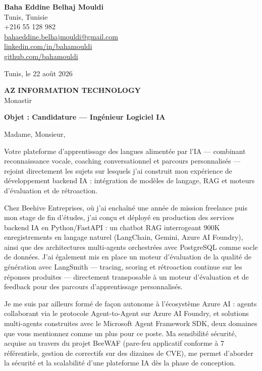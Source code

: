 \documentclass[a4paper,11pt]{article}
\begin{document}
\begin{flushright}
{\bfseries Baha Eddine Belhaj Mouldi}\\
Tunis, Tunisie\\
+216 55 128 982\\
\href{mailto:bahaeddine.belhajmouldi@gmail.com}{bahaeddine.belhajmouldi@gmail.com}\\
\href{https://linkedin.com/in/bahamouldi}{linkedin.com/in/bahamouldi}\\
\href{https://github.com/bahamouldi}{github.com/bahamouldi}
\end{flushright}

\vspace{0.8cm}

\begin{flushleft}
Tunis, le 22 août 2026

\vspace{0.8cm}

{\bfseries AZ INFORMATION TECHNOLOGY}\\
Monastir

\vspace{0.6cm}

{\bfseries Objet : Candidature --- Ingénieur Logiciel IA}
\end{flushleft}

\vspace{0.6cm}

Madame, Monsieur,

Votre plateforme d'apprentissage des langues alimentée par l'IA --- combinant reconnaissance vocale, coaching conversationnel et parcours personnalisés --- rejoint directement les sujets sur lesquels j'ai construit mon expérience de développement backend IA : intégration de modèles de langage, RAG et moteurs d'évaluation et de rétroaction.

Chez Beehive Entreprises, où j'ai enchaîné une année de mission freelance puis mon stage de fin d'études, j'ai conçu et déployé en production des services backend IA en Python/FastAPI : un chatbot RAG interrogeant 900K enregistrements en langage naturel (LangChain, Gemini, Azure AI Foundry), ainsi que des architectures multi-agents orchestrées avec PostgreSQL comme socle de données. J'ai également mis en place un moteur d'évaluation de la qualité de génération avec LangSmith --- tracing, scoring et rétroaction continue sur les réponses produites --- directement transposable à un moteur d'évaluation et de feedback pour des parcours d'apprentissage personnalisés.

Je me suis par ailleurs formé de façon autonome à l'écosystème Azure AI : agents collaborant via le protocole Agent-to-Agent sur Azure AI Foundry, et solutions multi-agents construites avec le Microsoft Agent Framework SDK, deux domaines que vous mentionnez comme un plus pour ce poste. Ma sensibilité sécurité, acquise au travers du projet BeeWAF (pare-feu applicatif conforme à 7 référentiels, gestion de correctifs sur des dizaines de CVE), me permet d'aborder la sécurité et la scalabilité d'une plateforme IA dès la phase de conception.
\end{document}
